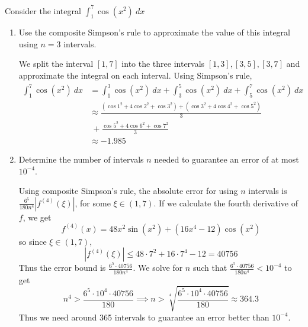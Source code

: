 \documentclass{eh-homework}
\begin{document}
    \newpage
    \begin{question}{3}
        Consider the integral \(\int _1^7 \cos (x^2)\ dx\)
        \begin{enumerate}[label=(\alph*)]
            \item Use the composite Simpson's rule to approximate the value of this integral using \(n=3\) intervals.
            
            We split the interval \([1,7]\) into the three intervals \([1,3], [3,5],[3,7]\) and approximate the integral on each interval. Using Simpson's rule,
            \begin{align*}
                \int _1^7 \cos (x^2)\ dx &= \int _1^3 \cos (x^2)\ dx + \int _3^5 \cos (x^2)\ dx + \int _5^7 \cos (x^2)\ dx \\
                &\approx \frac{(\cos 1^2 + 4 \cos 2^2 + \cos 3^2) + (\cos 3^2 + 4 \cos 4^2 + \cos 5^2)}{3} \\
                &\ + \frac{\cos 5^2 + 4 \cos 6^2 + \cos 7^2}{3} \\
                &\approx -1.985
            \end{align*}
            \item Determine the number of intervals \(n\) needed to guarantee an error of at most \(10^{-4}\).
            
            Using composite Simpson's rule, the absolute error for using \(n\) intervals is \(\frac{6^5}{180n^4}|f^{(4)}(\xi)|\), for some \(\xi \in (1,7)\). If we calculate the fourth derivative of \(f\), we get
            \[
                f^{(4)}(x) = 48x^2 \sin (x^2)+(16x^4 -12)\cos (x^2)
            \]
            so since \(\xi \in (1,7)\),
            \[
                |f^{(4)}(\xi)| \leq 48 \cdot 7^2 + 16 \cdot 7^4 - 12 = 40756
            \]
            Thus the error bound is \(\frac{6^5 \cdot 40756}{180n^4}\). We solve for \(n\) such that \(\frac{6^5 \cdot 40756}{180n^4} < 10^{-4}\) to get
            \[
                n^4 > \frac{6^5 \cdot 10^4 \cdot 40756}{180} \implies n > \sqrt[4]{\frac{6^5 \cdot 10^4 \cdot 40756}{180}} \approx 364.3
            \]
            Thus we need around 365 intervals to guarantee an error better than \(10^{-4}\).
        \end{enumerate}
    \end{question}
    \newpage
\end{document}
